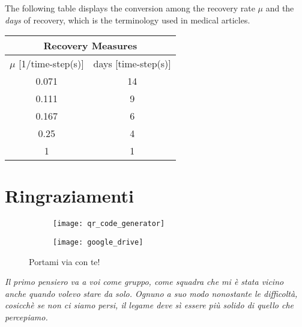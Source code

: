 \documentclass[a4paper,10pt, oneside]{book} %
\theoremstyle{definition}
\begin{document}
\clearpage
The following table displays the conversion among the recovery rate $\mu$ and the \textit{days} of recovery, which is the terminology used in medical articles. 
\label{App:muD_table}

\begin{center}
	\begin{tabular}{||c|c||}
		\hline
		\multicolumn{2}{|c|}{Recovery Measures}\\  
		\hline
		\multicolumn{1}{|c|}{$ \mu$ [1/time-step(s)] } & \multicolumn{1}{c|}{days [time-step(s)]}\\
		\hline
		0.071 &  14\\ 
		\hline
		0.111 & 9 \\
		\hline
		0.167 & 6 \\
		\hline
		0.25 & 4 \\
		\hline
		1 & 1 \\
		\hline
	\end{tabular}
\end{center}

\chapter{Ringraziamenti}
\vspace{-1.5cm}
\begin{figure}[h]
  \begin{subfigure}[t]{3cm}
    \texttt{[image: qr\_code\_generator]}
  \end{subfigure}
  \hfill
  \begin{subfigure}[t]{3cm}
    \texttt{[image: google\_drive]}
  \end{subfigure}
  \caption{Portami via con te!}
\end{figure}

\vspace{1cm}

\textit{Il primo pensiero va a voi come gruppo, come squadra che mi è stata vicino anche quando volevo stare da solo. Ognuno a suo modo nonostante le difficoltà, cosicchè se non ci siamo persi, il legame deve sì essere più solido di quello che percepiamo.} 
\end{document}
